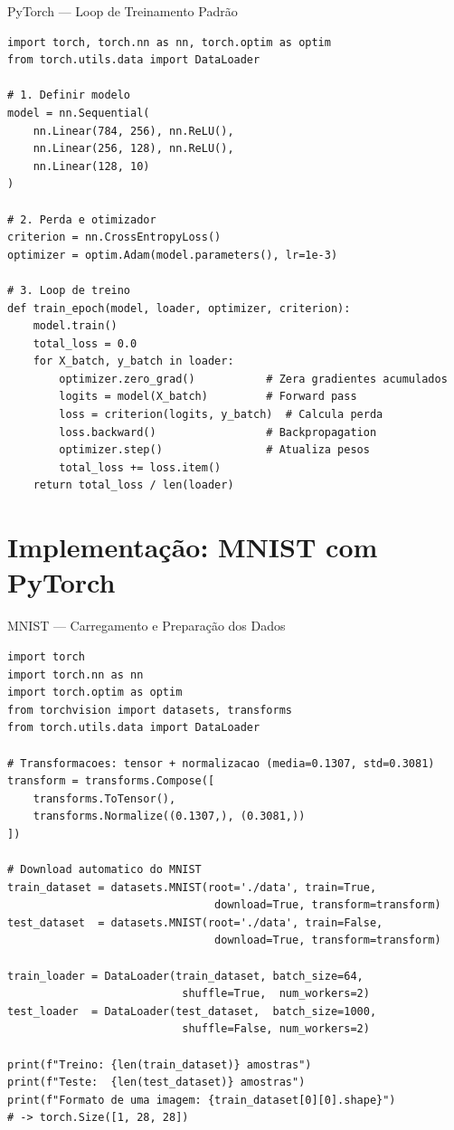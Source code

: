 \documentclass[7pt, aspectratio=169,10pt]{beamer}
\begin{document}
\begin{frame}[fragile]{PyTorch — Loop de Treinamento Padrão}
\begin{lstlisting}
import torch, torch.nn as nn, torch.optim as optim
from torch.utils.data import DataLoader

# 1. Definir modelo
model = nn.Sequential(
    nn.Linear(784, 256), nn.ReLU(),
    nn.Linear(256, 128), nn.ReLU(),
    nn.Linear(128, 10)
)

# 2. Perda e otimizador
criterion = nn.CrossEntropyLoss()
optimizer = optim.Adam(model.parameters(), lr=1e-3)

# 3. Loop de treino
def train_epoch(model, loader, optimizer, criterion):
    model.train()
    total_loss = 0.0
    for X_batch, y_batch in loader:
        optimizer.zero_grad()           # Zera gradientes acumulados
        logits = model(X_batch)         # Forward pass
        loss = criterion(logits, y_batch)  # Calcula perda
        loss.backward()                 # Backpropagation
        optimizer.step()                # Atualiza pesos
        total_loss += loss.item()
    return total_loss / len(loader)
\end{lstlisting}
\end{frame}

\section{Implementação: MNIST com PyTorch}

\begin{frame}[fragile]{MNIST — Carregamento e Preparação dos Dados}
\begin{lstlisting}
import torch
import torch.nn as nn
import torch.optim as optim
from torchvision import datasets, transforms
from torch.utils.data import DataLoader

# Transformacoes: tensor + normalizacao (media=0.1307, std=0.3081)
transform = transforms.Compose([
    transforms.ToTensor(),
    transforms.Normalize((0.1307,), (0.3081,))
])

# Download automatico do MNIST
train_dataset = datasets.MNIST(root='./data', train=True,
                                download=True, transform=transform)
test_dataset  = datasets.MNIST(root='./data', train=False,
                                download=True, transform=transform)

train_loader = DataLoader(train_dataset, batch_size=64, 
                           shuffle=True,  num_workers=2)
test_loader  = DataLoader(test_dataset,  batch_size=1000,
                           shuffle=False, num_workers=2)

print(f"Treino: {len(train_dataset)} amostras")
print(f"Teste:  {len(test_dataset)} amostras")
print(f"Formato de uma imagem: {train_dataset[0][0].shape}")
# -> torch.Size([1, 28, 28])
\end{lstlisting}
\end{frame}
\end{document}
